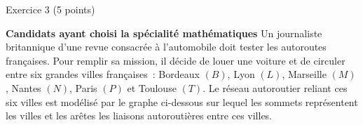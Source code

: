 
          \begin{h2}Exercice 3 (5 points)\end{h2}
          \textbf{Candidats ayant choisi la spécialité \og mathématiques \fg{}}
          \medbreak
          Un journaliste britannique d'une revue consacrée à l'automobile doit tester les autoroutes
          françaises. Pour remplir sa mission, il décide de louer une voiture et de circuler entre six grandes villes françaises~: Bordeaux $(B)$, Lyon $(L)$, Marseille $(M)$, Nantes $(N)$, Paris $(P)$ et Toulouse $(T)$.
          \smallbreak
          Le réseau autoroutier reliant ces six villes est modélisé par le graphe ci-dessous sur lequel les sommets représentent les villes et les arêtes les liaisons autoroutières entre ces villes.
          \begin{center}
\begin{extern}%

                \end{extern}
                                \end{center}
          \bigbreak
          \medbreak
